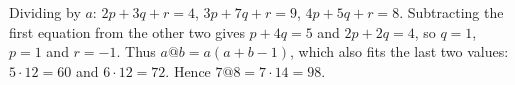 Dividing by $a$: $2p+3q+r=4$, $3p+7q+r=9$, $4p+5q+r=8$. Subtracting the first equation from the other two gives $p+4q=5$ and $2p+2q=4$, so $q=1$, $p=1$ and $r=-1$. Thus $a@b=a(a+b-1)$, which also fits the last two values: $5\cdot12=60$ and $6\cdot12=72$. Hence $7@8=7\cdot14=\boxed{98}$.
